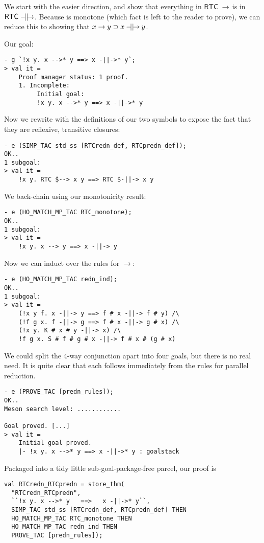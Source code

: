 We start with the easier direction, and show that everything in
${\sf RTC}\;\rightarrow$ is in ${\sf RTC}\;\mathbin{-\!\!\!\mid\mid\!\rightarrow}$.  Because
 is monotone (which fact is left to the reader to prove),
we can reduce this to showing that $x\rightarrow y\supset
x\mathbin{-\!\!\!\mid\mid\!\rightarrow} y$.

Our goal:
\begin{session}
\begin{verbatim}
- g `!x y. x -->* y ==> x -||->* y`;
> val it =
    Proof manager status: 1 proof.
    1. Incomplete:
         Initial goal:
         !x y. x -->* y ==> x -||->* y
\end{verbatim}
\end{session}
Now we rewrite with the definitions of our two symbols to expose the
fact that they are reflexive, transitive closures:
\begin{session}
\begin{verbatim}
- e (SIMP_TAC std_ss [RTCredn_def, RTCpredn_def]);
OK..
1 subgoal:
> val it =
    !x y. RTC $--> x y ==> RTC $-||-> x y
\end{verbatim}
\end{session}
We back-chain using our monotonicity result:
\begin{session}
\begin{verbatim}
- e (HO_MATCH_MP_TAC RTC_monotone);
OK..
1 subgoal:
> val it =
    !x y. x --> y ==> x -||-> y
\end{verbatim}
\end{session}
Now we can induct over the rules for $\rightarrow$:
\begin{session}
\begin{verbatim}
- e (HO_MATCH_MP_TAC redn_ind);
OK..
1 subgoal:
> val it =
    (!x y f. x -||-> y ==> f # x -||-> f # y) /\
    (!f g x. f -||-> g ==> f # x -||-> g # x) /\
    (!x y. K # x # y -||-> x) /\
    !f g x. S # f # g # x -||-> f # x # (g # x)
\end{verbatim}
\end{session}
We could split the 4-way conjunction apart into four goals, but there
is no real need.  It is quite clear that each follows immediately from
the rules for parallel reduction.
\begin{session}
\begin{verbatim}
- e (PROVE_TAC [predn_rules]);
OK..
Meson search level: ............

Goal proved. [...]
> val it =
    Initial goal proved.
    |- !x y. x -->* y ==> x -||->* y : goalstack
\end{verbatim}
\end{session}
Packaged into a tidy little sub-goal-package-free parcel, our proof is
\begin{session}
\begin{verbatim}
val RTCredn_RTCpredn = store_thm(
  "RTCredn_RTCpredn",
  ``!x y. x -->* y   ==>   x -||->* y``,
  SIMP_TAC std_ss [RTCredn_def, RTCpredn_def] THEN
  HO_MATCH_MP_TAC RTC_monotone THEN
  HO_MATCH_MP_TAC redn_ind THEN
  PROVE_TAC [predn_rules]);
\end{verbatim}
\end{session}
\eos{}

